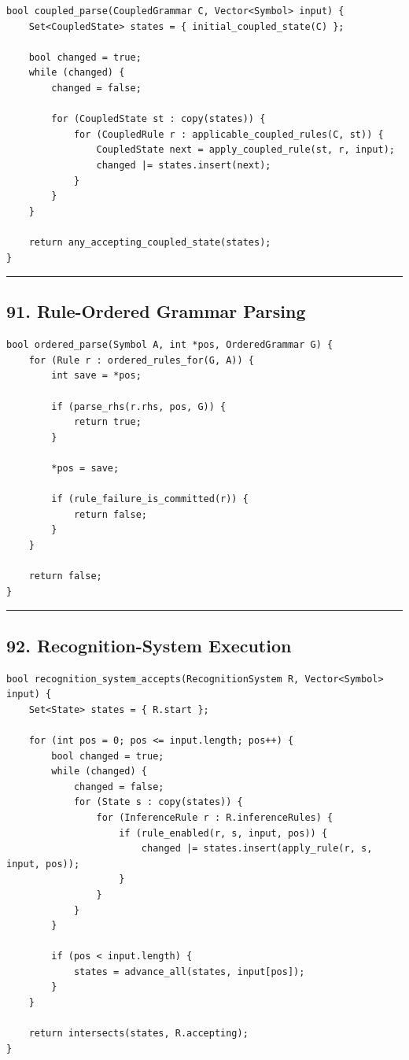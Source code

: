 \documentclass[10pt,letterpaper]{article}
\begin{document}
\begin{verbatim}
bool coupled_parse(CoupledGrammar C, Vector<Symbol> input) {
    Set<CoupledState> states = { initial_coupled_state(C) };

    bool changed = true;
    while (changed) {
        changed = false;

        for (CoupledState st : copy(states)) {
            for (CoupledRule r : applicable_coupled_rules(C, st)) {
                CoupledState next = apply_coupled_rule(st, r, input);
                changed |= states.insert(next);
            }
        }
    }

    return any_accepting_coupled_state(states);
}
\end{verbatim}

\medskip\hrule\medskip

\subsection*{91. Rule-Ordered Grammar Parsing}

\begin{verbatim}
bool ordered_parse(Symbol A, int *pos, OrderedGrammar G) {
    for (Rule r : ordered_rules_for(G, A)) {
        int save = *pos;

        if (parse_rhs(r.rhs, pos, G)) {
            return true;
        }

        *pos = save;

        if (rule_failure_is_committed(r)) {
            return false;
        }
    }

    return false;
}
\end{verbatim}

\medskip\hrule\medskip

\subsection*{92. Recognition-System Execution}

\begin{verbatim}
bool recognition_system_accepts(RecognitionSystem R, Vector<Symbol> input) {
    Set<State> states = { R.start };

    for (int pos = 0; pos <= input.length; pos++) {
        bool changed = true;
        while (changed) {
            changed = false;
            for (State s : copy(states)) {
                for (InferenceRule r : R.inferenceRules) {
                    if (rule_enabled(r, s, input, pos)) {
                        changed |= states.insert(apply_rule(r, s, input, pos));
                    }
                }
            }
        }

        if (pos < input.length) {
            states = advance_all(states, input[pos]);
        }
    }

    return intersects(states, R.accepting);
}
\end{verbatim}
\end{document}
